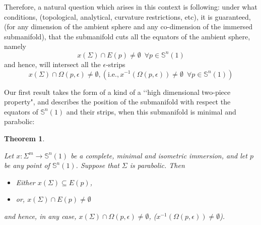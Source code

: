 \documentclass{amsart}
\newtheorem{theorem}{Theorem}[section]
\theoremstyle{definition}
\theoremstyle{remark}
\begin{document}
    
  Therefore,  a natural question which arises in this context is following: under what conditions, (topological, analytical, curvature restrictions, etc), it is guaranteed, (for any dimension of the ambient sphere and any co-dimension of the immersed submanifold), that the submanifold cuts all the equators of the ambient sphere, namely
        $$x(\Sigma) \cap E(p) \neq \emptyset\,\,\,\forall p \in \mathbb{S}^n(1)$$ and hence, will intersect all the $\epsilon$-strips
        $$x(\Sigma) \cap \Omega(p,\epsilon) \neq \emptyset, (\text{i.e.}, x^{-1}(\Omega(p,\epsilon))\neq \emptyset\,\,\,\forall p \in \mathbb{S}^n(1))$$

    Our first result  takes the form of a kind of a \lq\lq high dimensional two-piece property", and describes the position of the submanifold with respect the equators of $\mathbb{S}^n(1)$ and their strips, when this submanifold is minimal and parabolic:

\begin{theorem}\label{twopiecegeneral}

Let $x:\Sigma^m \to \mathbb{S}^n(1)$ be a complete,  minimal and isometric immersion, and let $p$ be any point of $\mathbb{S}^n(1)$. Suppose that $\Sigma$ is parabolic. Then
    \begin{itemize}
        \item Either $x(\Sigma)\subseteq E(p)$, 
        \item or, $x(\Sigma)\cap E(p)\neq \emptyset$
            \end{itemize}
            and  hence, in any case,  $x(\Sigma) \cap \Omega(p,\epsilon) \neq \emptyset$, ($x^{-1}(\Omega(p,\epsilon))\neq \emptyset$).
\end{theorem}
\end{document}
